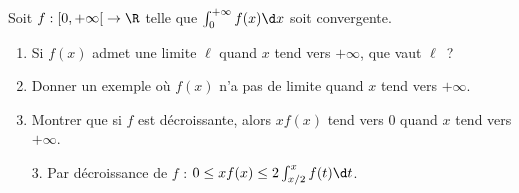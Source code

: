 \begin{enonce}
\begin{exercise}[ID={RMS124 E678 Mines-Ponts PSI},subtitle={2013 Mines-Ponts PSI},tags={}]
Soit $f:\left[0,+\infty\right[\to\R$ telle que $\int_0^{+\infty} f(x)\d x$ soit convergente.
\begin{enumerate}
  \item Si $f(x)$ admet une limite $\ell$ quand $x$ tend vers $+\infty$, que vaut $\ell$~?
  \item Donner un exemple où $f(x)$ n'a pas de limite quand $x$ tend vers $+\infty$.
  \item Montrer que si $f$ est décroissante, alors $xf(x)$ tend vers $0$ quand $x$ tend vers $+\infty$.
\end{enumerate}
\end{exercise}
\begin{solution}
\begin{itemize}
\item[3.] Par décroissance de $f$ : $0 \leq x f(x) \leq 2 \int_{x/2}^x f(t)\d t$.
\end{itemize}
\end{solution}
\end{enonce}
